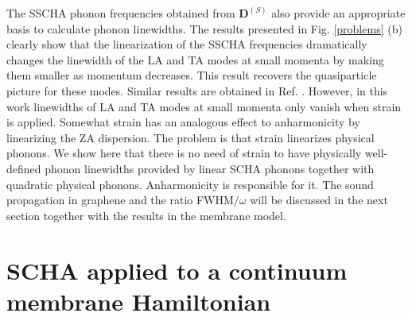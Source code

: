 The SSCHA phonon frequencies obtained from $\boldsymbol{D}^{(S)}$ also provide an appropriate basis to calculate 
phonon linewidths\cite{bianco2017second,aseginolaza2019phonon}. The results presented in Fig. \ref{problems} (b) 
clearly show that the linearization of the SSCHA frequencies dramatically changes the linewidth of the LA and TA 
modes at small momenta by making them smaller as momentum decreases. This result recovers the quasiparticle picture 
for these modes. Similar results are obtained in Ref. \cite{bonini2012acoustic}. However, in this work linewidths of 
LA and TA modes at small momenta only vanish when strain is applied. Somewhat strain has an analogous effect to 
anharmonicity by linearizing the ZA dispersion. The problem is that strain linearizes physical phonons. We show here 
that there is no need of strain to have physically well-defined phonon linewidths provided by 
linear SCHA phonons together with quadratic physical phonons. Anharmonicity is responsible for it. The sound 
propagation in graphene and the ratio FWHM$/\omega$ will be discussed in the next section together with the results 
in the membrane model.

\section{SCHA applied to a continuum membrane Hamiltonian}


